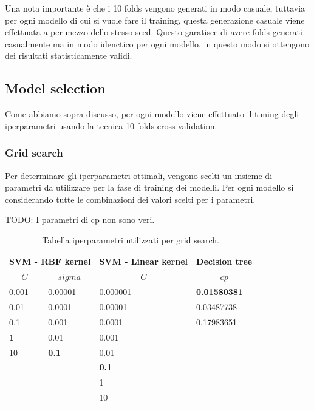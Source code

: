 Una nota importante è che i 10 folds vengono generati in modo casuale, tuttavia per ogni modello di cui si vuole fare il training, questa generazione casuale viene effettuata a per mezzo dello stesso seed. Questo garatisce di avere folds generati casualmente ma in modo idenctico per ogni modello, in questo modo si ottengono dei risultati statisticamente validi.

\subsection{Model selection}
\label{sec:mode_selection}
Come abbiamo sopra discusso, per ogni modello viene effettuato il tuning degli iperparametri usando la tecnica 10-folds cross validation.

\subsubsection{Grid search}
\label{sec:grid-search}
Per determinare gli iperparametri ottimali, vengono scelti un insieme di parametri da utilizzare per la fase di training dei modelli. Per ogni modello si considerando tutte le combinazioni dei valori scelti per i parametri.


TODO: I parametri di cp non sono veri.
\begin{table}[H]
	
	\begin{center}
		
		\begin{tabular}{| l | l | l | l |}
			\hline
			\multicolumn{2}{|c|}{\textbf{SVM -  RBF kernel}} &
			\multicolumn{1}{|c|}{\textbf{SVM - Linear kernel}} &
			\multicolumn{1}{c|}{\textbf{Decision tree}}\\
			\hline
			\hline
			\multicolumn{1}{|c}{$C$} &
			\multicolumn{1}{c|}{$sigma$} &
			\multicolumn{1}{c|}{$C$ } &
			\multicolumn{1}{c|}{$cp$}\\
			\hline
			0.001	 & 0.00001    & 0.000001 & \textbf{0.01580381}\\
			0.01	  & 0.0001      &0.00001	& 0.03487738\\
			0.1	   & 0.001      	&0.0001	   & 0.17983651\\
			\textbf{1}			& 0.01      	  &0.001		  & \\
			10	   &\textbf{ 0.1 }     	  &0.01		   & \\
			&       		   	     &\textbf{0.1}			   & \\
			&       	  			 &1				& \\
			&       	  			 &10			   & \\
				  		   
			\hline
		\end{tabular}
		
	\end{center}
	\label{tab:iperparametri}
	\caption{Tabella iperparametri utilizzati per grid search.}
\end{table}

